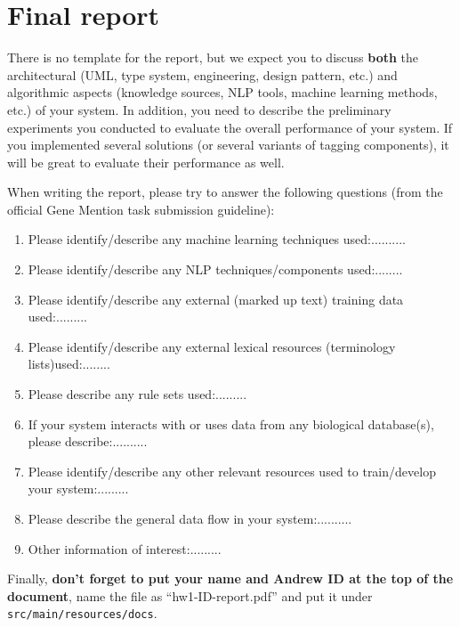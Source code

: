 
\section{Final report}
There is no template for the report, but we expect you to discuss 
\textbf{both}
the architectural (UML, type system, engineering, design
pattern, etc.) and algorithmic aspects (knowledge sources, NLP tools,
machine learning methods, etc.) of your system. 
In addition,
you need to describe the preliminary experiments you
conducted to evaluate the overall performance of your system.
If you implemented several solutions (or several variants of
 tagging components), 
it will be great to evaluate their performance as well.

When writing the report,
please try to answer the following questions (from the official Gene Mention task submission
guideline):

\begin{enumerate}
\item Please identify/describe any machine learning techniques used:.......... 
\item Please identify/describe any NLP techniques/components used:........ 
\item Please identify/describe any external (marked up text) training data used:......... 
\item Please identify/describe any external lexical resources (terminology lists)used:........ 
\item Please describe any rule sets used:......... 
\item If your system interacts with or uses data from any biological database(s), please describe:.......... 
\item Please identify/describe any other relevant resources used to train/develop your system:......... 
\item Please describe the general data flow in your system:.......... 
\item Other information of interest:.........
\end{enumerate}

Finally, \textbf{don't forget to put your name and Andrew ID at the top of the document},
name the file as ``hw1-ID-report.pdf'' and put it under
\texttt{src/main/resources/docs}.
